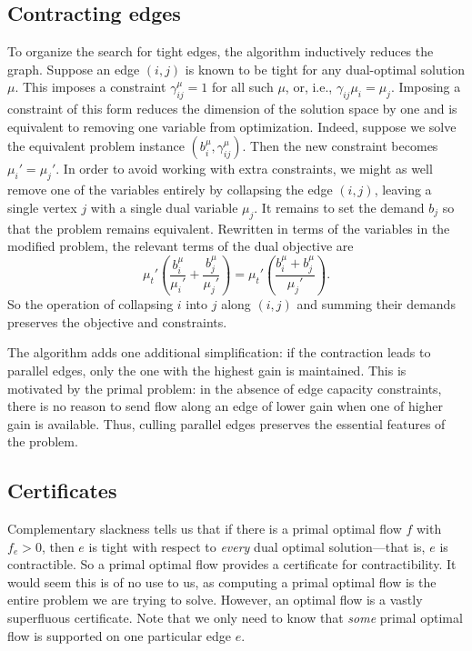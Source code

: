 \documentclass[11pt]{article}
\theoremstyle{definition}
\theoremstyle{definition}
\newcommand{\biu}{b_{i}^{\mu}}
\newcommand{\gij}{\gamma_{ij}}
\newcommand{\giij}{\gamma_{ij}^{\mu}}
\begin{document}
    \subsection{Contracting edges}
    To organize the search for tight edges, the algorithm inductively reduces the graph.
    Suppose an edge $(i, j)$ is known to be tight for any dual-optimal solution $\mu$. This
    imposes a constraint $\giij = 1$ for all such $\mu$, or, i.e., $\gij \mu_i = \mu_j$.
    Imposing a constraint of this form reduces the dimension of the solution
    space by one and is equivalent to removing one variable from optimization. Indeed,
    suppose we solve the equivalent problem instance $(\biu, \giij)$. Then the new constraint
    becomes $\mu_i' = \mu_j'$. In order to avoid working with extra constraints, we might
    as well remove one of the variables entirely by collapsing the edge $(i, j)$, leaving a single
    vertex $j$ with a single dual variable $\mu_j$. It remains to set the demand $b_j$ so
    that the problem remains equivalent. Rewritten in terms of the variables in
    the modified problem, the relevant terms of the dual objective are
    \[ \mu_t' \left(\frac{b_i^\mu}{\mu_i'} + \frac{b_j^\mu}{\mu_j'}\right)
     = \mu_t' \left(\frac{b_i^\mu + b_j^\mu}{\mu_j'}\right). \]
	So the operation of collapsing $i$ into $j$ along $(i, j)$ and summing their demands
	preserves the objective and constraints.
	
	The algorithm adds one additional simplification: if the contraction leads to parallel edges,
	only the one with the highest gain is maintained. This is motivated by the primal problem: in
	the absence of edge capacity constraints, there is no reason to send flow along an edge of
	lower gain when one of higher gain is available. Thus, culling parallel edges preserves the
	essential features of the problem.
	
	\subsection{Certificates}
	Complementary slackness tells us that if there is a primal optimal flow $f$ with
	$f_e > 0$, then $e$ is tight with respect to \emph{every} dual optimal solution---that
	is, $e$ is contractible. So a primal optimal flow provides a certificate for contractibility.
	It would seem this is of no use to us, as computing a primal optimal flow is the entire
	problem we are trying to solve. However, an optimal flow is a vastly superfluous certificate.
	Note that we only need to know that \emph{some}
	primal optimal flow is supported on one particular edge $e$.
	
\end{document}
